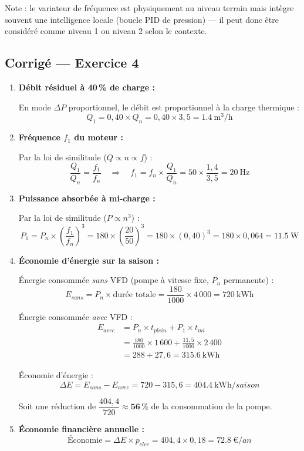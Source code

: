 \begin{methode}
Note : le variateur de fréquence est physiquement au niveau terrain mais intègre souvent une intelligence locale (boucle PID de pression) — il peut donc être considéré comme niveau 1 ou niveau 2 selon le contexte.
\end{methode}

\subsection*{Corrigé — Exercice 4}

\begin{enumerate}
  \item \textbf{Débit résiduel à 40\,\% de charge :}

  En mode $\Delta P$ proportionnel, le débit est proportionnel à la charge thermique :
  \[
    Q_1 = 0{,}40 \times Q_n = 0{,}40 \times 3{,}5 = \boxed{\SI{1.4}{\cubic\metre\per\hour}}
  \]

  \item \textbf{Fréquence $f_1$ du moteur :}

  Par la loi de similitude ($Q \propto n \propto f$) :
  \[
    \frac{Q_1}{Q_n} = \frac{f_1}{f_n}
    \quad\Rightarrow\quad
    f_1 = f_n \times \frac{Q_1}{Q_n} = 50 \times \frac{1{,}4}{3{,}5} = \boxed{\SI{20}{\hertz}}
  \]

  \item \textbf{Puissance absorbée à mi-charge :}

  Par la loi de similitude ($P \propto n^3$) :
  \[
    P_1 = P_n \times \left(\frac{f_1}{f_n}\right)^3 = 180 \times \left(\frac{20}{50}\right)^3
         = 180 \times (0{,}40)^3 = 180 \times 0{,}064 = \boxed{\SI{11.5}{\watt}}
  \]

  \item \textbf{Économie d'énergie sur la saison :}

  Énergie consommée \textit{sans} VFD (pompe à vitesse fixe, $P_n$ permanente) :
  \[
    E_{sans} = P_n \times \text{durée totale} = \frac{180}{1000} \times 4\,000 = \SI{720}{\kilo\watt\hour}
  \]

  Énergie consommée \textit{avec} VFD :
  \begin{align*}
    E_{avec} &= P_n \times t_{plein} + P_1 \times t_{mi} \\
             &= \frac{180}{1000} \times 1\,600 + \frac{11{,}5}{1000} \times 2\,400 \\
             &= 288 + 27{,}6 = \SI{315.6}{\kilo\watt\hour}
  \end{align*}

  Économie d'énergie :
  \[
    \Delta E = E_{sans} - E_{avec} = 720 - 315{,}6 = \boxed{\SI{404.4}{\kilo\watt\hour/saison}}
  \]

  Soit une réduction de $\dfrac{404{,}4}{720} \approx \mathbf{56\,\%}$ de la consommation de la pompe.

  \item \textbf{Économie financière annuelle :}
  \[
    \text{Économie} = \Delta E \times p_{elec} = 404{,}4 \times 0{,}18 = \boxed{\SI{72.8}{\euro/an}}
  \]
\end{enumerate}

